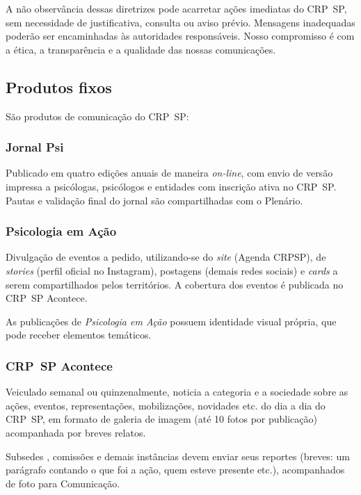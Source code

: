 A não observância dessas diretrizes pode acarretar ações imediatas do CRP~SP, sem necessidade de justificativa, consulta ou aviso prévio. Mensagens inadequadas poderão ser encaminhadas às autoridades responsáveis. Nosso compromisso é com a ética, a transparência e a qualidade das nossas comunicações.

\subsection{Produtos fixos}

São produtos de comunicação do CRP~SP:

\subsubsection{Jornal Psi}

Publicado em quatro edições anuais de maneira \emph{on-line}, com envio de versão impressa a psicólogas, psicólogos e entidades com inscrição ativa no CRP~SP. Pautas e validação final do jornal são compartilhadas com o Plenário.

\subsubsection{Psicologia em Ação}

Divulgação de eventos a pedido, utilizando-se do \emph{site} (Agenda CRPSP), de \emph{stories} (perfil oficial no Instagram), postagens (demais redes sociais) e \emph{cards} a serem compartilhados pelos territórios. A cobertura dos eventos é publicada no CRP~SP Acontece.

As publicações de \emph{Psicologia em Ação} possuem identidade visual própria, que pode receber elementos temáticos.

\subsubsection{CRP~SP Acontece}

Veiculado semanal ou quinzenalmente, noticia a categoria e a sociedade sobre as ações, eventos, representações, mobilizações, novidades etc. do dia a dia do CRP~SP, em formato de galeria de imagem (até 10 fotos por publicação) acompanhada por breves relatos.

Subsedes , comissões e demais instâncias devem enviar seus reportes (breves: um parágrafo contando o que foi a ação, quem esteve presente etc.), acompanhados de foto para Comunicação.

